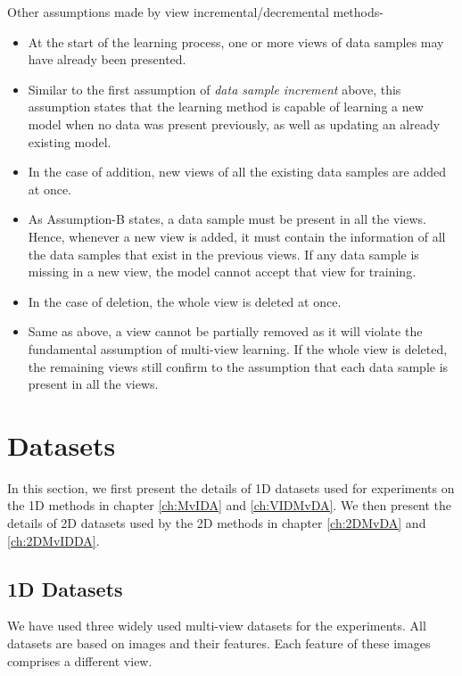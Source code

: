 \noindent
Other assumptions made by view incremental/decremental methods-
\begin{itemize}
	\item[a)] At the start of the learning process, one or more views of data samples may have already been presented.
	\item[-] Similar to the first assumption of \textit{data sample increment} above, this assumption states that the learning method is capable of learning a new model when no data was present previously, as well as updating an already existing model.
	
	\item[b)] In the case of addition, new views of all the existing data samples are added at once.
	\item[-] As Assumption-B states, a data sample must be present in all the views. Hence, whenever a new view is added, it must contain the information of all the data samples that exist in the previous views. If any data sample is missing in a new view, the model cannot accept that view for training.
	
	\item[c)] In the case of deletion, the whole view is deleted at once.
	\item[-] Same as above, a view cannot be partially removed as it will violate the fundamental assumption of multi-view learning. If the whole view is deleted, the remaining views still confirm to the assumption that each data sample is present in all the views.
	
\end{itemize}














\section{Datasets}
\label{sec:Dataset}
\hspace{0.8cm}In this section, we first present the details of 1D datasets used for experiments on the 1D methods in chapter \ref{ch:MvIDA} and \ref{ch:VIDMvDA}. We then present the details of 2D datasets used by the 2D methods in chapter \ref{ch:2DMvDA} and \ref{ch:2DMvIDDA}.



\subsection{1D Datasets}
\label{subs:1D_Data}
\hspace{0.8cm}We have used three widely used multi-view datasets for the experiments. All datasets are based on images and their features. Each feature of these images comprises a different view.

